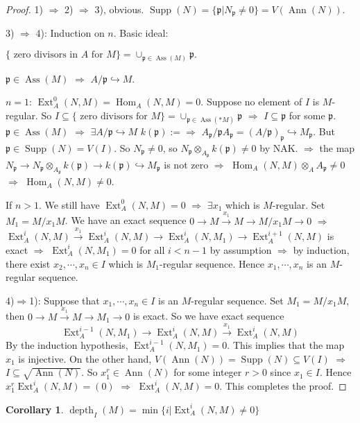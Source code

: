 \documentclass[cs4size]{article}
\newcommand{\su}{\subseteq}
\newcommand{\frp}{\mathfrak{p}}
\newcommand{\ra}{\rightarrow}
\newcommand{\xr}{\xrightarrow}
\newcommand{\Ra}{\Rightarrow}
\DeclareMathOperator{\Ext}{Ext}
\DeclareMathOperator{\Hom}{Hom}
\DeclareMathOperator{\Ann}{Ann}
\DeclareMathOperator{\Supp}{Supp}
\DeclareMathOperator{\Ass}{Ass}
\DeclareMathOperator{\depth}{depth}
\newtheorem{cor}{Corollary}
\begin{document}
\begin{proof}
1) $\Ra$ 2) $\Ra$ 3), obvious. $\Supp (N)=\{\frp|N_\frp\neq 0\}=V(\Ann(N))$.

3) $\Ra$ 4): Induction on $n$. Basic ideal:

$\{\text{ zero divisors in }A \text{ for }M\}=\cup_{\frp\in\Ass(M)}\frp.$

$\frp\in\Ass(M)$ $\Ra$ $A/\frp\hookrightarrow M$.

$n=1$: $\Ext_A^0(N,M)=\Hom_A(N,M)=0$. Suppose no element of $I$ is $M$-regular. So $I\su \{\text{ zero divisors for }M\}=\cup_{\frp\in\Ass(*M)}\frp$ $\Ra$ $I\su \frp$ for some $\frp$. $\frp\in\Ass(M)$ $\Ra$ $\exists A/\frp\hookrightarrow M$ $k(\frp):=\Ra$ $A_\frp/\frp A_\frp=(A/\frp)_\frp\hookrightarrow M_\frp$. But $\frp\in\Supp(N)=V(I)$. So $N_\frp\neq 0$, so $N_\frp\otimes _{A_\frp}k(\frp)\neq0$ by NAK. $\Ra$ the map $N_\frp\ra N_\frp\otimes_{A_\frp}k(\frp)\ra k(\frp)\hookrightarrow M_\frp$ is not zero $\Ra$ $\Hom_A(N,M)\otimes_AA_\frp\neq 0$ $\Ra$ $\Hom_A(N,M)\neq0$.

If $n>1$. We still have $\Ext_A^0(N,M)=0$ $\Ra$ $\exists x_1$ which is $M$-regular. Set $M_1=M/x_1M$. We have an exact sequence $0\ra M\xr{x_1}M\ra M/x_1M\ra 0$ $\Ra$ $\Ext_A^i(N,M)\xr{x_1}\Ext_A^i(N,M)\ra\Ext_A^i(N,M_1)\ra \Ext_A^{i+1}(N,M)$ is exact $\Ra$ $\Ext_A^i(N,M_1)=0$ for all $i<n-1$ by assumption $\Ra$ by induction, there exist $x_2,\cdots,x_n\in I$ which is $M_1$-regular sequence. Hence $x_1,\cdots,x_n$ is an $M$-regular sequence.

4)$\Ra$1): Suppose that $x_1,\cdots,x_n\in I$ is an $M$-regular sequence. Set $M_1=M/x_1M$, then $0\ra M\xr{x_1}M\ra M_1\ra0$ is exact. So we have exact sequence
\[\Ext_A^{i-1}(N,M_1)\ra\Ext_A^i(N,M)\xr{x_1}\Ext_A^i(N,M)\]
By the induction hypothesis, $\Ext_A^{i-1}(N,M_1)=0$. This implies that the map $x_1$ is injective. On the other hand, $V(\Ann(N))=\Supp(N)\su V(I)$ $\Ra$ $I\su\sqrt{\Ann(N)}$. So $x_1^r\in\Ann(N)$ for some integer $r>0$ since $x_1\in I$. Hence $x_1^r\Ext_A^i(N,M)=(0)$ $\Ra$ $\Ext_A^i(N,M)=0$. This completes the proof.
\end{proof}

\begin{cor}
$\depth_I(M)=\min\{i|\Ext_A^i(N,M)\neq 0\}$
\end{cor}
\end{document}
